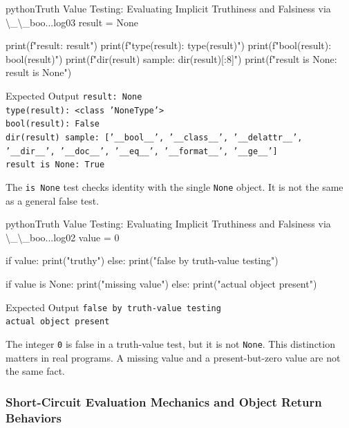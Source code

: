 \documentclass[a4paper,twoside]{report}
\begin{document}
\begin{codebox}[]{python}{Truth Value Testing: Evaluating Implicit Truthiness and Falsiness via \textbackslash{}\_\textbackslash{}\_boo...}{log03}
result = None

print(f"result: {result}")
print(f"type(result): {type(result)}")
print(f"bool(result): {bool(result)}")
print(f"dir(result) sample: {dir(result)[:8]}")
print(f"result is None: {result is None}")
\end{codebox}


\begin{iobox}{Expected Output}
\texttt{result: None} \\
\texttt{type(result): <class 'NoneType'>} \\
\texttt{bool(result): False} \\
\texttt{dir(result) sample: ['\_\_bool\_\_', '\_\_class\_\_', '\_\_delattr\_\_', '\_\_dir\_\_', '\_\_doc\_\_', '\_\_eq\_\_', '\_\_format\_\_', '\_\_ge\_\_']} \\
\texttt{result is None: True} \\
\end{iobox}


The \texttt{is None} test checks identity with the single \texttt{None} object. It is not the same as a general false test.

\begin{codebox}[]{python}{Truth Value Testing: Evaluating Implicit Truthiness and Falsiness via \textbackslash{}\_\textbackslash{}\_boo...}{log02}
value = 0

if value:
    print("truthy")
else:
    print("false by truth-value testing")

if value is None:
    print("missing value")
else:
    print("actual object present")
\end{codebox}


\begin{iobox}{Expected Output}
\texttt{false by truth-value testing} \\
\texttt{actual object present} \\
\end{iobox}


The integer \texttt{0} is false in a truth-value test, but it is not \texttt{None}. This distinction matters in real programs. A missing value and a present-but-zero value are not the same fact.

\subsubsection{Short-Circuit Evaluation Mechanics and Object Return Behaviors}
\end{document}
